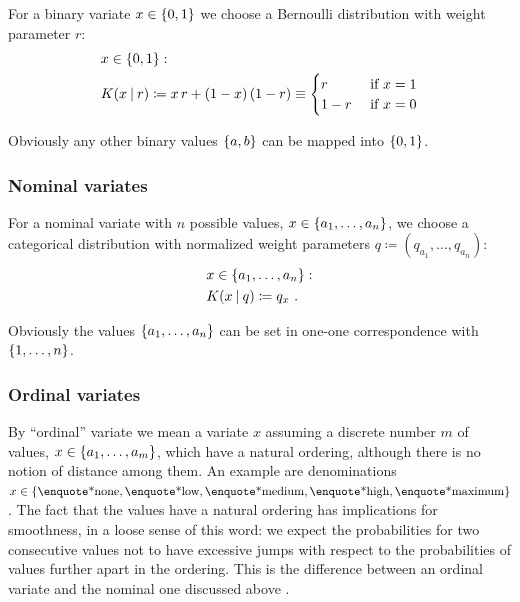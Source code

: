 \documentclass[a4paper,12pt,%
onecolumn,oneside,article,%
british%
]{memoir}
\makeatletter
\def\sum{\DOTSI\sumop\slimits@}
\newcommand*{\delt}{\deltaup}%
\newcommand*{\defd}{\coloneqq}
\DeclarePairedDelimiter\set{\{}{\}} %
\renewcommand*{\|}[1][]{\nonscript\:#1\vert\nonscript\:\mathopen{}}
\newcommand*{\mo}[1][=]{\mathclose{}\mathord{\nonscript\mkern0.5mu#1\nonscript\mkern0.5mu}\mathopen{}}
\newcommand*{\cf}{{cf.}}
\makeatother
\begin{document}
For a binary variate $x \in \set{0,1}$ we choose a Bernoulli distribution with weight parameter $r$:
\begin{equation}
  \label{eq:K_bin}
  \begin{split}
    &x \in \set{0,1}:
\\
    &K(x \| r) \defd x\, r + (1-x)\,(1-r) \equiv
  \begin{cases}
    r&\text{ if $x=1$} \\1-r&\text{ if $x=0$}
  \end{cases}
\end{split}
\end{equation}

Obviously any other binary values $\set{a,b}$ can be mapped into $\set{0,1}$.

\subsubsection{Nominal variates}
\label{sec:variates_nominal}

For a nominal variate with $n$ possible values, $x \in \set{a_{1}, \dotsc, a_{n}}$, we choose a categorical distribution with normalized weight parameters $q \defd (q_{a_1}, \dotsc, q_{a_n})$:
\begin{equation}
  \label{eq:K_cat}
  \begin{split}
    &x \in \set{a_{1}, \dotsc, a_{n}}:
    \\
  &K(x \| q) \defd q_{x} \ .%
\end{split}
\end{equation}

Obviously the values $\set{a_{1}, \dotsc, a_{n}}$ can be set in one-one correspondence with $\set{1, \dotsc, n}$.

\subsubsection{Ordinal variates}
\label{sec:variates_ordinal}

By \enquote{ordinal} variate we mean a variate $x$ assuming a discrete number $m$ of values, $x \in \set{a_{1}, \dotsc, a_{m}}$, which have a natural ordering, although there is no notion of distance among them. An example are denominations $x \in \set{\text{\enquote*{none}}, \text{\enquote*{low}}, \text{\enquote*{medium}}, \text{\enquote*{high}}, \text{\enquote*{maximum}}}$. The fact that the values have a natural ordering has implications for smoothness, in a loose sense of this word: we expect the probabilities for two consecutive values not to have excessive jumps with respect to the probabilities of values further apart in the ordering. This is the difference between an ordinal variate and the nominal one discussed above \autocites[\cf][]{stevens1946}.
\end{document}
